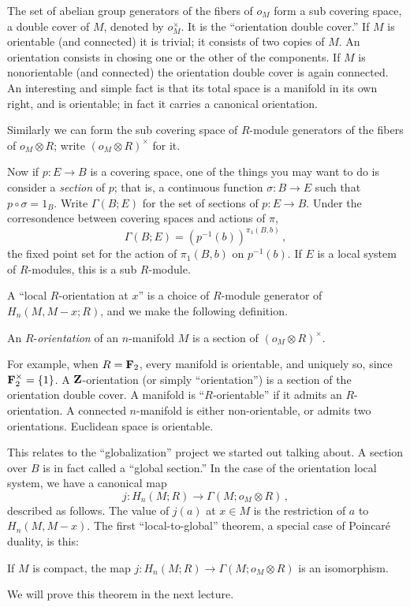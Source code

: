 The set of abelian group generators of the fibers of $o_M$ 
form a sub covering space, a double cover of $M$, denoted by $o_M^\times$.
It is the ``orientation double cover.'' If $M$ is
orientable (and connected) it is trivial; it consists of two copies of $M$. 
An orientation consists in chosing one or the other of the components. 
If $M$ is nonorientable (and connected) the orientation double cover is again 
connected. An interesting and simple fact is that its total space is a manifold
in its own right, and is orientable; in fact it carries a canonical 
orientation. 

Similarly we can form the sub covering space of $R$-module generators of
the fibers of $o_M\otimes R$; write $(o_M\otimes R)^\times$ for it. 

\medskip
Now if $p:E\to B$ is a covering space, one of the things you may want to do 
is consider a {\em section} of $p$; that is, a continuous function 
$\sigma:B\to E$ such that $p\circ\sigma=1_B$. Write $\Gamma(B;E)$ for
the set of sections of $p:E\to B$. Under the corresondence
between covering spaces and actions of $\pi$, 
\[
\Gamma(B;E)=(p^{-1}(b))^{\pi_1(B,b)}\,,
\]
the fixed point set for the action of $\pi_1(B,b)$ on $p^{-1}(b)$. 
If $E$ is a local system of $R$-modules, this is a sub $R$-module. 

A ``local $R$-orientation at $x$'' is a choice of $R$-module generator of 
$H_n(M,M-x;R)$, and we make the following definition. 

\begin{definition} An $R$-{\em orientation} of an $n$-manifold $M$ is a 
section of $(o_M\otimes R)^\times$.
\end{definition}

For example, when $R=\mathbf F_2$, every manifold is orientable, 
and uniquely so, since $\mathbf F_2^\times=\{1\}$. A $\mathbf Z$-orientation (or simply
``orientation'') is a section of the orientation double cover. 
A manifold is ``$R$-orientable'' if it admits an $R$-orientation.  
A connected $n$-manifold is either non-orientable, or admits two 
orientations. Euclidean space is orientable. 

This relates to the ``globalization'' project we started out talking about. 
A section over $B$ is in fact called a ``global section.'' In the case of
the orientation local system, we have a canonical map
\[
j:H_n(M;R)\to \Gamma(M;o_M\otimes R)\,,
\]
described as follows. The value of $j(a)$ at $x\in M$ is the restriction
of $a$ to $H_n(M,M-x)$. The first ``local-to-global'' theorem, 
a special case of Poincar\'e duality, is this:
\begin{theorem} 
If $M$ is compact, the map $j:H_n(M;R)\to\Gamma(M;o_M\otimes R)$ 
is an isomorphism. 
\label{thm-orientation}
\end{theorem}
We will prove this theorem in the next lecture.

